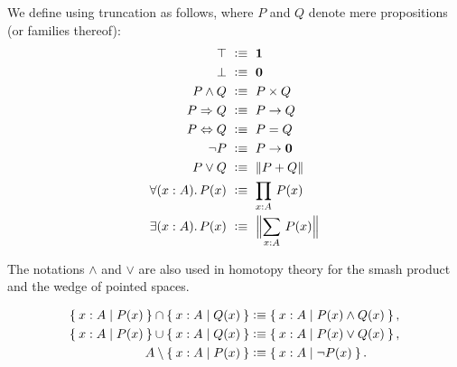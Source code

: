 \documentclass[hott-all.tex]{subfiles}
\begin{document}
\begin{defn} 
  We define 
  using truncation as follows, where $P$ and $Q$ denote mere propositions (or families thereof):
  {\allowdisplaybreaks
  \begin{align*}
    \top            &\ \defeq \ \unit \\
    \bot            &\ \defeq \ \emptyt \\
    P \land Q       &\ \defeq \ P \times Q \\
    P \Rightarrow Q &\ \defeq \ P \to Q \\
    P \Leftrightarrow Q &\ \defeq \ P = Q \\
    \neg P          &\ \defeq \ P \to \emptyt \\
    P \lor Q        &\ \defeq \ \brck{P + Q} \\
    \fall{x : A} P(x) &\ \defeq \ \prd{x : A} P(x) \\
    \exis{x : A} P(x) &\ \defeq \ \Brck{\sm{x : A} P(x)}
  \end{align*}}
\end{defn}

The notations $\land$ and $\lor$ are also used in homotopy theory for the smash
product and the wedge of pointed spaces.

\begin{align*}
  \Set{x:A | P(x)} \cap \Set{x:A | Q(x)}
  &\vcentcolon\equiv \Set{x:A | P(x) \land Q(x)},\\
  \Set{x:A | P(x)} \cup \Set{x:A | Q(x)}
  &\vcentcolon\equiv \Set{x:A | P(x) \lor Q(x)},\\
  A \setminus \Set{x:A | P(x)}
  &\vcentcolon\equiv \Set{x:A | \neg P(x)}.
\end{align*}
\end{document}
